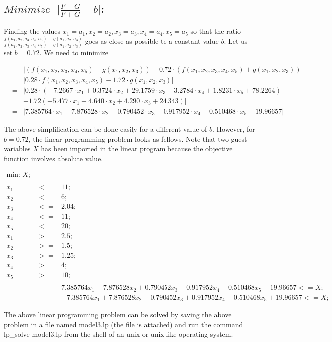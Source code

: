 \documentclass[11pt]{article}
\begin{document}
\subsection{$Minimize \text{ } \vert \frac{F-G}{F+G} - b\vert$:}Finding the values $x_1 = a_1,x_2 = a_2,x_3 = a_3,x_4 = a_4,x_5 = a_5$ so that the ratio $\frac{f(a_1,a_2,a_3,a_4,a_5)-g(a_1,a_2,a_3)}{f(a_1,a_2,a_3,a_4,a_5)+g(a_1,a_2,a_3)}$  goes as close as possible to a constant value $b$. Let us set $b = 0.72$. We need to minimize
\begin{tiny}
\begin{eqnarray*}
& &\vert \left( f(x_1,x_2,x_3,x_4,x_5) - g(x_1,x_2,x_3)\right) - 0.72 \cdot \left( f(x_1,x_2,x_3,x_4,x_5) + g(x_1,x_2,x_3)\right) \vert \\
&=& \vert 0.28 \cdot f(x_1,x_2,x_3,x_4,x_5) - 1.72 \cdot g(x_1,x_2,x_3) \vert \\
&=& \vert 0.28 \cdot \left( -7.2667 \cdot x_1 + 0.3724 \cdot x_2 + 29.1759 \cdot x_3 - 3.2784 \cdot x_4 + 1.8231 \cdot x_5 + 78.2264 \right) \\
& & - 1.72 \left( -5.477 \cdot x_1 + 4.640 \cdot x_2 + 4.290 \cdot x_3 + 24.343 \right) \vert \\
&=& \vert 7.385764 \cdot x_1  - 7.876528 \cdot x_2 + 0.790452 \cdot x_3 -  0.917952 \cdot x_4 + 0.510468 \cdot x_5 - 19.96657 \vert
\end{eqnarray*}
\end{tiny}The above simplification can be done easily for a different value of $b$. However, for $b=0.72$, the linear programming problem looks as follows. Note that two guest variables $X$ has been imported in the linear program because the objective function involves absolute value.
\begin{tiny}
\begin{eqnarray*}
\text{min: } X;\\
\\
x_1 &<=& 11;\\
x_2 &<=& 6;\\
x_3 &<=& 2.04;\\
x_4 &<=& 11;\\
x_5 &<=& 20;\\
x_1 &>=& 2.5;\\
x_2 &>=& 1.5;\\
x_3 &>=& 1.25;\\
x_4 &>=& 4;\\
x_5 &>=& 10;\\
\\
& & 7.385764 x_1  - 7.876528 x_2 + 0.790452 x_3 -  0.917952 x_4 + 0.510468 x_5 - 19.96657 <= X;\\
& & - 7.385764 x_1 + 7.876528 x_2 - 0.790452 x_3 + 0.917952 x_4 - 0.510468 x_5 + 19.96657 <= X;
\end{eqnarray*}
\end{tiny} The above linear programming problem can be solved by saving the above problem in a file named \textsf{model3.lp} (the file is attached) and run the command \textsf{lp\_solve model3.lp} from the shell of an unix or unix like operating system. 
\end{document}
